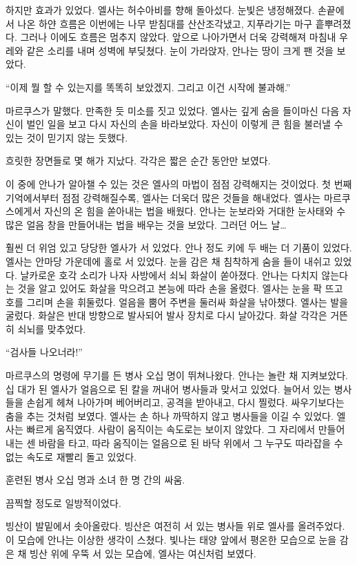 하지만 효과가 있었다. 엘사는 허수아비를 향해 돌아섰다. 눈빛은 냉정해졌다. 손끝에서 나온 하얀 흐름은 이번에는 나무 받침대를 산산조각냈고, 지푸라기는 마구 흩뿌려졌다. 그러나 이에도 흐름은 멈추지 않았다. 앞으로 나아가면서 더욱 강력해져 마침내 우레와 같은 소리를 내며 성벽에 부딪쳤다. 눈이 가라앉자, 안나는 땅이 크게 팬 것을 보았다.

``이제 뭘 할 수 있는지를 똑똑히 보았겠지. 그리고 이건 시작에 불과해.''

마르쿠스가 말했다. 만족한 듯 미소를 짓고 있었다. 엘사는 깊게 숨을 들이마신 다음 자신이 벌인 일을 보고 다시 자신의 손을 바라보았다. 자신이 이렇게 큰 힘을 불러낼 수 있는 것이 믿기지 않는 듯했다.

흐릿한 장면들로 몇 해가 지났다. 각각은 짧은 순간 동안만 보였다.

이 중에 안나가 알아챌 수 있는 것은 엘사의 마법이 점점 강력해지는 것이었다. 첫 번째 기억에서부터 점점 강력해질수록, 엘사는 더욱더 많은 것들을 해내었다. 엘사는 마르쿠스에게서 자신의 온 힘을 쏟아내는 법을 배웠다. 안나는 눈보라와 거대한 눈사태와 수많은 얼음 창을 만들어내는 법을 배우는 것을 보았다. 그러던 어느 날\ldots

훨씬 더 위엄 있고 당당한 엘사가 서 있었다. 안나 정도 키에 두 배는 더 기품이 있었다. 엘사는 안마당 가운데에 홀로 서 있었다. 눈을 감은 채 침착하게 숨을 들이 내쉬고 있었다. 날카로운 호각 소리가 나자 사방에서 쇠뇌 화살이 쏟아졌다. 안나는 다치지 않는다는 것을 알고 있어도 화살을 막으려고 본능에 따라 손을 올렸다. 엘사는 눈을 팍 뜨고 호를 그리며 손을 휘둘렀다. 얼음을 뿜어 주변을 둘러싸 화살을 낚아챘다. 엘사는 발을 굴렀다. 화살은 반대 방향으로 발사되어 발사 장치로 다시 날아갔다. 화살 각각은 거뜬히 쇠뇌를 맞추었다.

``검사들 나오너라!''

마르쿠스의 명령에 무기를 든 병사 오십 명이 뛰쳐나왔다. 안나는 놀란 채 지켜보았다. 십 대가 된 엘사가 얼음으로 된 칼을 꺼내어 병사들과 맞서고 있었다. 늘어서 있는 병사들을 손쉽게 헤쳐 나아가며 베어버리고, 공격을 받아내고, 다시 찔렀다. 싸우기보다는 춤을 추는 것처럼 보였다. 엘사는 손 하나 까딱하지 않고 병사들을 이길 수 있었다. 엘사는 빠르게 움직였다. 사람이 움직이는 속도로는 보이지 않았다. 그 자리에서 만들어내는 센 바람을 타고, 따라 움직이는 얼음으로 된 바닥 위에서 그 누구도 따라잡을 수 없는 속도로 재빨리 돌고 있었다.

훈련된 병사 오십 명과 소녀 한 명 간의 싸움.

끔찍할 정도로 일방적이었다.

빙산이 발밑에서 솟아올랐다. 빙산은 여전히 서 있는 병사들 위로 엘사를 올려주었다. 이 모습에 안나는 이상한 생각이 스쳤다. 빛나는 태양 앞에서 평온한 모습으로 눈을 감은 채 빙산 위에 우뚝 서 있는 모습에, 엘사는 여신처럼 보였다.

